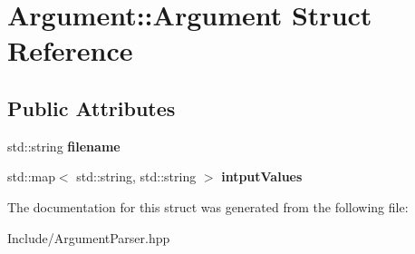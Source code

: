 \hypertarget{structArgument_1_1Argument}{}\section{Argument\+:\+:Argument Struct Reference}
\label{structArgument_1_1Argument}
\subsection*{Public Attributes}
\begin{DoxyCompactItemize}
\item 
\mbox{\label{structArgument_1_1Argument_a1e23ee52d7f708ec227768d927f890ce}} 
std\+::string {\bfseries filename}
\item 
\mbox{\label{structArgument_1_1Argument_a0b50c92cb0cb20e9779520297a9ec399}} 
std\+::map$<$ std\+::string, std\+::string $>$ {\bfseries intput\+Values}
\end{DoxyCompactItemize}


The documentation for this struct was generated from the following file\+:\begin{DoxyCompactItemize}
\item 
Include/Argument\+Parser.\+hpp\end{DoxyCompactItemize}
